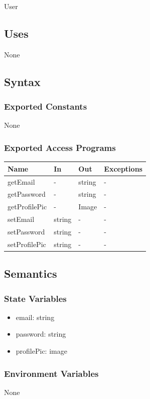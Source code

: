 \documentclass[12pt, titlepage]{article}
\begin{document}
User

\subsection{Uses}
None

\subsection{Syntax}

\subsubsection{Exported Constants}
None
\subsubsection{Exported Access Programs}

\begin{center}
\begin{tabular}{p{2cm} p{4cm} p{4cm} p{2cm}}
\hline
\textbf{Name} & \textbf{In} & \textbf{Out} & \textbf{Exceptions} \\
\hline
getEmail & - & string & - \\
getPassword & - & string & - \\
getProfilePic & - & Image & - \\
setEmail & string & - & - \\
setPassword & string & - & - \\
setProfilePic & string & - & - \\
\hline
\end{tabular}
\end{center}

\subsection{Semantics}

\subsubsection{State Variables}
\begin{itemize}
    \item email: string
    \item password: string
    \item profilePic: image
\end{itemize}
\subsubsection{Environment Variables}
None
\end{document}
